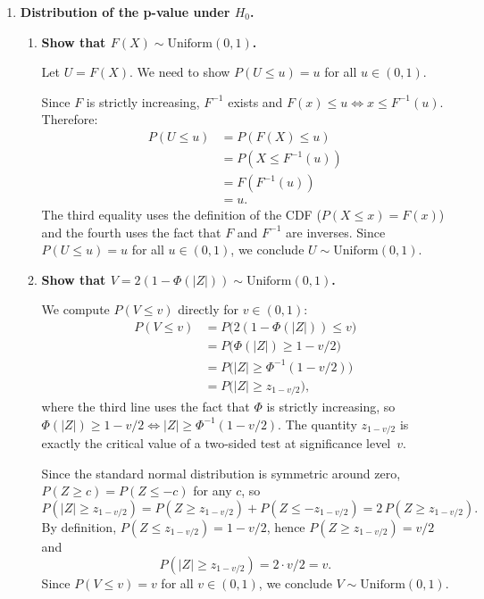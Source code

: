 \documentclass[12pt]{article}
\begin{document}
\begin{enumerate}
\item \textbf{Distribution of the p-value under $H_0$.}

\begin{enumerate}

\item \textbf{Show that $F(X) \sim \text{Uniform}(0,1)$.}

Let $U = F(X)$. We need to show $P(U \le u) = u$ for all $u \in (0,1)$.

Since $F$ is strictly increasing, $F^{-1}$ exists and $F(x) \le u \iff x \le F^{-1}(u)$. Therefore:
\begin{align*}
P(U \le u) &= P(F(X) \le u) \\
&= P(X \le F^{-1}(u)) \\
&= F(F^{-1}(u)) \\
&= u.
\end{align*}
The third equality uses the definition of the CDF ($P(X \le x) = F(x)$) and the fourth uses the fact that $F$ and $F^{-1}$ are inverses. Since $P(U \le u) = u$ for all $u \in (0,1)$, we conclude $U \sim \text{Uniform}(0,1)$.

\bigskip

\item \textbf{Show that $V = 2(1 - \Phi(|Z|)) \sim \text{Uniform}(0,1)$.}

We compute $P(V \le v)$ directly for $v \in (0,1)$:
\begin{align*}
P(V \le v)
&= P\bigl(2(1 - \Phi(|Z|)) \le v\bigr) \\
&= P\bigl(\Phi(|Z|) \ge 1 - v/2\bigr) \\
&= P\bigl(|Z| \ge \Phi^{-1}(1 - v/2)\bigr) \\
&= P\bigl(|Z| \ge z_{1-v/2}\bigr),
\end{align*}
where the third line uses the fact that $\Phi$ is strictly increasing, so $\Phi(|Z|) \ge 1 - v/2 \iff |Z| \ge \Phi^{-1}(1 - v/2)$. The quantity $z_{1-v/2}$ is exactly the critical value of a two-sided test at significance level~$v$.

Since the standard normal distribution is symmetric around zero, $P(Z \ge c) = P(Z \le -c)$ for any $c$, so
$$
P(|Z| \ge z_{1-v/2}) = P(Z \ge z_{1-v/2}) + P(Z \le -z_{1-v/2}) = 2\,P(Z \ge z_{1-v/2}).
$$
By definition, $P(Z \le z_{1-v/2}) = 1 - v/2$, hence $P(Z \ge z_{1-v/2}) = v/2$ and
$$
P(|Z| \ge z_{1-v/2}) = 2 \cdot v/2 = v.
$$
Since $P(V \le v) = v$ for all $v \in (0,1)$, we conclude $V \sim \text{Uniform}(0,1)$.

\bigskip


\end{enumerate}
\end{enumerate}
\end{document}
